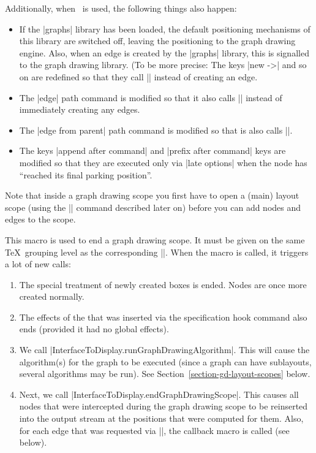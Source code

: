 \begin{command}{\pgfgdbeginscope}
  Additionally, when \tikzname\ is used, the following things also
  happen:
  \begin{itemize}
  \item If the |graphs| library has been loaded, the default
    positioning mechanisms of this library are switched off, leaving
    the positioning to the graph drawing engine. Also, when an edge is
    created by the |graphs| library, this is signalled to the graph
    drawing library. (To be more precise: The keys |new ->| and so on
    are redefined so that they call |\pgfgdedge| instead of creating
    an edge.
  \item The |edge| path command is modified so that it also calls
    |\pgfgdedge| instead of immediately creating any edges.
  \item The |edge from parent| path command is modified so that is
    also calls |\pgfgdedge|.
  \item The keys |append after command| and |prefix after command|
    keys are modified so that they are executed only via
    |late options| when the node has ``reached its final parking
    position''. 
  \end{itemize}
  
  Note that inside a graph drawing scope you first have to open a
  (main) layout scope (using the |\pgfgdbeginlayout| command described
  later on) before you can add nodes and edges to the scope. 
\end{command}


\begin{command}{\pgfgdendscope}
  This macro is used to end a graph drawing scope. It must be given on
  the same \TeX\ grouping level as the corresponding
  |\pgfgdbeginscope|. When the macro is called, it triggers a lot of
  new calls:
  \begin{enumerate}
  \item The special treatment of newly created boxes is ended. Nodes
    are once more created normally.
  \item The effects of the  that was inserted via the
    specification hook command also ends (provided it had no global
    effects).
  \item We call |InterfaceToDisplay.runGraphDrawingAlgorithm|. This
    will cause the algorithm(s) for the graph to be executed (since a
    graph can have sublayouts, several algorithms may be run). See
    Section~\ref{section-gd-layout-scopes} below. 
  \item Next, we call |InterfaceToDisplay.endGraphDrawingScope|. 
    This causes all nodes that were intercepted during the
    graph drawing scope to be reinserted into the output stream at the
    positions that were computed for them. Also, for each edge that
    was requested via |\pgfgdedge|, the callback macro is
    called (see below).
  \end{enumerate}
\end{command}


